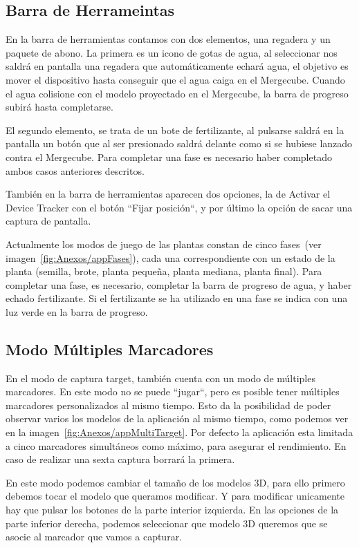 
\subsection{Barra de Herrameintas}
En la barra de herramientas contamos con dos elementos, una regadera y un paquete de abono. La primera es un icono de gotas de agua, al seleccionar nos saldrá en pantalla una regadera que automáticamente echará agua, el objetivo es mover el dispositivo hasta conseguir que el agua caiga en el Mergecube. Cuando el agua colisione con el modelo proyectado en el Mergecube, la barra de progreso subirá hasta completarse. 

El segundo elemento, se trata de un bote de fertilizante, al pulsarse saldrá en la pantalla un botón que al ser presionado saldrá delante como si se hubiese lanzado contra el Mergecube.
Para completar una fase es necesario haber completado ambos casos anteriores descritos.

También en la barra de herramientas aparecen dos opciones, la de Activar el Device Tracker con el botón ``Fijar posición``, y por último la opción de sacar una captura de pantalla.


Actualmente los modos de juego de las plantas constan de cinco fases~(ver imagen~\ref{fig:Anexos/appFases}), cada una correspondiente con un estado de la planta (semilla, brote, planta pequeña, planta mediana, planta final). Para completar una fase, es necesario, completar la barra de progreso de agua, y haber echado fertilizante. Si el fertilizante se ha utilizado en una fase se indica con una luz verde en la barra de progreso.


\subsection{Modo Múltiples Marcadores}
En el modo de captura target, también cuenta con un modo de múltiples marcadores. En este modo no se puede ``jugar``, pero es posible tener múltiples marcadores personalizados al mismo tiempo. Esto da la posibilidad de poder observar varios los modelos de la aplicación al mismo tiempo, como podemos ver en la imagen~\ref{fig:Anexos/appMultiTarget}. Por defecto la aplicación esta limitada a cinco marcadores simultáneos como máximo, para asegurar el rendimiento. En caso de realizar una sexta captura borrará la primera.


En este modo podemos cambiar el tamaño de los modelos 3D, para ello primero debemos tocar el modelo que queramos modificar. Y para modificar unicamente hay que pulsar los botones de la parte interior izquierda.
En las opciones de la parte inferior derecha, podemos seleccionar que modelo 3D queremos que se asocie al marcador que vamos a capturar.


 


